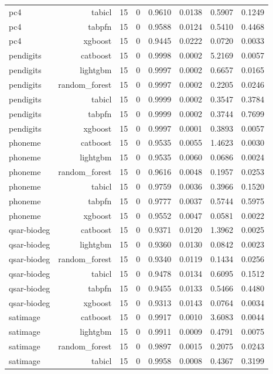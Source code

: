 \begin{table}[htbp]
\begin{tabular}{lrrrrrrr}
pc4 & tabicl & 15 & 0 & 0.9610 & 0.0138 & 0.5907 & 0.1249 \\
pc4 & tabpfn & 15 & 0 & 0.9588 & 0.0124 & 0.5410 & 0.4468 \\
pc4 & xgboost & 15 & 0 & 0.9445 & 0.0222 & 0.0720 & 0.0033 \\
pendigits & catboost & 15 & 0 & 0.9998 & 0.0002 & 5.2169 & 0.0057 \\
pendigits & lightgbm & 15 & 0 & 0.9997 & 0.0002 & 0.6657 & 0.0165 \\
pendigits & random\_forest & 15 & 0 & 0.9997 & 0.0002 & 0.2205 & 0.0246 \\
pendigits & tabicl & 15 & 0 & 0.9999 & 0.0002 & 0.3547 & 0.3784 \\
pendigits & tabpfn & 15 & 0 & 0.9999 & 0.0002 & 0.3744 & 0.7699 \\
pendigits & xgboost & 15 & 0 & 0.9997 & 0.0001 & 0.3893 & 0.0057 \\
phoneme & catboost & 15 & 0 & 0.9535 & 0.0055 & 1.4623 & 0.0030 \\
phoneme & lightgbm & 15 & 0 & 0.9535 & 0.0060 & 0.0686 & 0.0024 \\
phoneme & random\_forest & 15 & 0 & 0.9616 & 0.0048 & 0.1957 & 0.0253 \\
phoneme & tabicl & 15 & 0 & 0.9759 & 0.0036 & 0.3966 & 0.1520 \\
phoneme & tabpfn & 15 & 0 & 0.9777 & 0.0037 & 0.5744 & 0.5975 \\
phoneme & xgboost & 15 & 0 & 0.9552 & 0.0047 & 0.0581 & 0.0022 \\
qsar-biodeg & catboost & 15 & 0 & 0.9371 & 0.0120 & 1.3962 & 0.0025 \\
qsar-biodeg & lightgbm & 15 & 0 & 0.9360 & 0.0130 & 0.0842 & 0.0023 \\
qsar-biodeg & random\_forest & 15 & 0 & 0.9340 & 0.0119 & 0.1434 & 0.0256 \\
qsar-biodeg & tabicl & 15 & 0 & 0.9478 & 0.0134 & 0.6095 & 0.1512 \\
qsar-biodeg & tabpfn & 15 & 0 & 0.9455 & 0.0133 & 0.5466 & 0.4480 \\
qsar-biodeg & xgboost & 15 & 0 & 0.9313 & 0.0143 & 0.0764 & 0.0034 \\
satimage & catboost & 15 & 0 & 0.9917 & 0.0010 & 3.6083 & 0.0044 \\
satimage & lightgbm & 15 & 0 & 0.9911 & 0.0009 & 0.4791 & 0.0075 \\
satimage & random\_forest & 15 & 0 & 0.9897 & 0.0015 & 0.2075 & 0.0243 \\
satimage & tabicl & 15 & 0 & 0.9958 & 0.0008 & 0.4367 & 0.3199 \\

\end{tabular}
\end{table}
